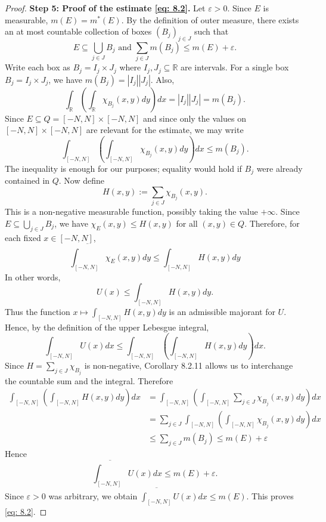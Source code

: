 \begin{proof}
\textbf{Step 5: Proof of the estimate \autoref{eq: 8.2}.}
Let $\varepsilon>0$. Since $E$ is measurable, $m(E)=m^{*}(E)$. By the definition of outer measure, there exists an at most countable collection of boxes $(B_{j})_{j\in J}$ such that 
\[
    E\subseteq\bigcup_{j\in J}B_{j} \text{ and }  \sum_{j\in J}m(B_{j})\le m(E)+\varepsilon.
\]
Write each box as $B_{j}=I_{j}\times J_{j}$ where $I_{j}, J_{j}\subseteq\mathbb{R}$ are intervals. For a single box $B_{j}=I_{j}\times J_{j}$, we have $m(B_{j})=|I_{j}||J_{j}|$. Also,
\[
    \int_{\mathbb{R}}\left(\int_{\mathbb{R}}\chi_{B_{j}}(x,y)dy\right)dx=|I_{j}||J_{j}|=m(B_{j}).
\]
Since $E\subseteq Q=[-N,N]\times[-N,N]$ and since only the values on $[-N,N]\times[-N,N]$ are relevant for the estimate, we may write
\[
    \int_{[-N,N]}\left(\int_{[-N,N]}\chi_{B_{j}}(x,y)dy\right)dx\le m(B_{j}).
\]
The inequality is enough for our purposes; equality would hold if $B_{j}$ were already contained in $Q$. Now define
\[
    H(x,y):=\sum_{j\in J}\chi_{B_{j}}(x,y).
\]
This is a non-negative measurable function, possibly taking the value $+\infty$. Since $E\subseteq\bigcup_{j\in J}B_{j}$, we have $\chi_{E}(x,y)\le H(x,y)$ for all $(x,y)\in Q$. Therefore, for each fixed $x\in[-N,N]$,
\[
    \overline{\int_{[-N,N]}} \chi_{E}(x,y)dy\le\int_{[-N,N]}H(x,y)dy
\]
In other words,
\[
    U(x)\le\int_{[-N,N]}H(x,y)dy.
\]
Thus the function $x\mapsto\int_{[-N,N]}H(x,y)dy$ is an admissible majorant for $U$. Hence, by the definition of the upper Lebesgue integral,
\[
    \int_{[-N,N]}U(x)dx\le\int_{[-N,N]}\left(\int_{[-N,N]}H(x,y)dy\right)dx.
\]
Since $H=\sum_{j\in J}\chi_{B_{j}}$ is non-negative, Corollary 8.2.11 allows us to interchange the countable sum and the integral. Therefore
\begin{align*}
    \int_{[-N,N]}\left(\int_{[-N,N]}H(x,y)dy\right)dx &=\int_{[-N,N]}\left(\int_{[-N,N]}\sum_{j\in J}\chi_{B_{j}}(x,y)dy\right)dx \\
    &= \sum_{j\in J}\int_{[-N,N]}\left(\int_{[-N,N]}\chi_{B_{j}}(x,y)dy\right)dx \\
    &\le\sum_{j\in J}m(B_{j}) \le m(E)+\varepsilon
\end{align*}
Hence
\[
    \overline{\int_{[-N,N]}} U(x)dx\le m(E)+\varepsilon.
\]
Since $\varepsilon>0$ was arbitrary, we obtain $\overline{\int_{[-N,N]}} U(x)dx\le m(E)$. This proves \autoref{eq: 8.2}.


\end{proof}
